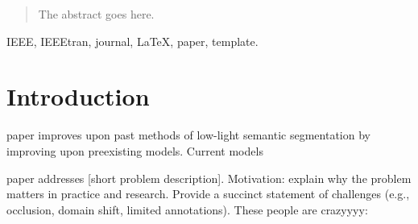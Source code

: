 \documentclass[journal]{IEEEtran}
\begin{document}







\maketitle

\begin{abstract}
    The abstract goes here.
\end{abstract}

\begin{IEEEkeywords}
    IEEE, IEEEtran, journal, \LaTeX, paper, template.
\end{IEEEkeywords}






%
\IEEEpeerreviewmaketitle



\section{Introduction}

 paper improves upon past methods of low-light semantic segmentation by improving upon preexisting models. Current models

paper addresses [short problem description]. Motivation: explain why the problem matters in practice and research. Provide a succinct statement of challenges (e.g., occlusion, domain shift, limited annotations).
These people are crazyyyy: \cite{weiDeepRetinexDecomposition2018}
\end{document}
